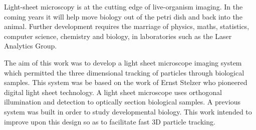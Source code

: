 Light-sheet microscopy is at the cutting edge of live-organism imaging.
In the coming years it will help move biology out of the petri dish and back into the animal.
Further development requires the marriage of physics, maths, statistics, computer science, chemistry and biology, in laboratories such as the Laser Analytics Group.



The aim of this work was to develop a light sheet microscope imaging system which permitted the three dimensional tracking of particles through biological samples.
This system was be based on the work of Ernst Stelzer who pioneered digital light sheet technology\cite{Huisken2004}.
A light sheet microscope uses orthogonal illumination and detection to optically section biological samples.
A previous system was built in order to study developmental biology.
This work intended to improve upon this design so as to facilitate fast 3D particle tracking.



